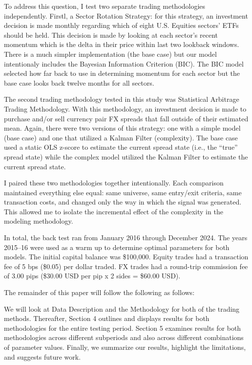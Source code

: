 \documentclass[12pt]{article}
\begin{document}
To address this question, I test two separate trading methodologies independently. Firstl, a Sector Rotation Strategy: for this strategy, an investment decision is made monthly regarding which of eight U.S. Equities sectors' ETFs should be held. This decision is made by looking at each sector's recent momentum which is the delta in their price within last two lookback windows. There is a much simpler implementation (the base case) but our model intentionaly includes the Bayesian Information Criterion (BIC). The BIC model selected how far back to use in determining momentum for each sector but the base case looks back twelve months for all sectors.

The second trading methodology tested in this study was Statistical Arbitrage Trading Methodology. With this methodology, an investment decision is made to purchase and/or sell currency pair FX spreads that fall outside of their estimated mean. Again, there were two versions of this strategy: one with a simple model (base case) and one that utilized a Kalman Filter (complexity). The base case used a static OLS z-score to estimate the current spread state (i.e., the ``true'' spread state) while the complex model utilized the Kalman Filter to estimate the current spread state.

I paired these two methodologies together intentionally. Each comparison maintained everything else equal: same universe, same entry/exit criteria, same transaction costs, and changed only the way in which the signal was generated. This allowed me to isolate the incremental effect of the complexity in the modeling methodology.

In total, the back test ran from January 2016 through December 2024. The years 2015--16 were used as a warm up to determine optimal parameters for both models. The initial capital balance was \$100,000. Equity trades had a transaction fee of 5 bps (\$0.05) per dollar traded. FX trades had a round-trip commission fee of 3.00 pips (\$30.00 USD per pip x 2 sides = \$60.00 USD).

The remainder of this paper will follow the following as follows:

We will look at Data Description and the Methodology for both of the trading methods. Thereafter, Section 4 outlines and displays results for both methodologies for the entire testing period. Section 5 examines results for both methodologies across different subperiods and also across different combinations of parameter values. Finally, we summarize our results, highlight the limitations, and suggests future work.
\end{document}
